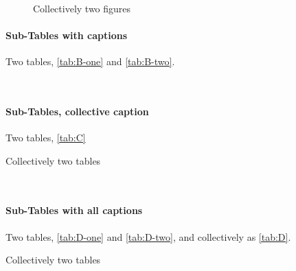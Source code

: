 \documentclass{article}
\begin{document}
\begin{figure}[ht]
\begin{center}
\\
\caption{Collectively two figures\label{fig:D}}
\end{center}
\end{figure}

\paragraph{Sub-Tables with captions}
Two tables, \ref{tab:B-one} and \ref{tab:B-two}.

\begin{table}[ht]
\begin{center}
\\
\end{center}
\end{table}

\paragraph{Sub-Tables, collective caption}
Two tables, \ref{tab:C}

\begin{table}[ht]
\caption{Collectively two tables\label{tab:C}}
\begin{center}
\\
\end{center}
\end{table}

\paragraph{Sub-Tables with all captions}
Two tables, \ref{tab:D-one} and \ref{tab:D-two},
and collectively as \ref{tab:D}.

\begin{table}[ht]
\caption{Collectively two tables\label{tab:D}}
\begin{center}
\\
\end{center}
\end{table}
\end{document}
